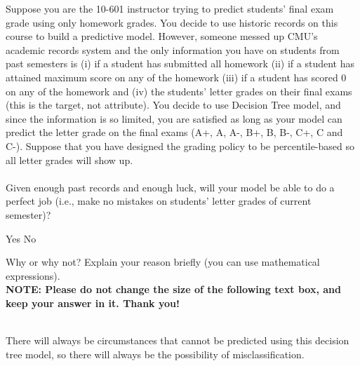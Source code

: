\documentclass[11pt,addpoints,answers]{exam}
\numberwithin{equation}{section} %
\numberwithin{figure}{section} %
\numberwithin{table}{section} %
\begin{document}
\begin{questions}

    \question[3] Suppose you are the 10-601 instructor trying to predict students' final exam grade using only homework grades. You decide to use historic records on this course to build a predictive model. However, someone messed up CMU's academic records system and the only information you have on students from past semesters is (i) if a student has submitted all homework (ii) if a student has attained maximum score on any of the homework (iii) if a student has scored 0 on any of the homework and  (iv) the students' letter grades on their final exams (this is the target, not attribute). You decide to use Decision Tree model, and since the information is so limited, you are satisfied as long as your model can predict the letter grade on the final exams  (A+, A, A-, B+, B, B-, C+, C and C-). Suppose that you have designed the grading policy to be percentile-based so all letter grades will show up. \\ \\
    Given enough past records and enough luck, will your model be able to do a perfect job (i.e., make no mistakes on students' letter grades of current semester)?
    
    \begin{checkboxes}
        \choice Yes
        \CorrectChoice No
    \end{checkboxes}
    Why or why not? Explain your reason briefly (you can use mathematical expressions).\\
    
    \textbf{NOTE: Please do not change the size of the following text box, and keep your answer in it. Thank you!} \\ \\
    \begin{tcolorbox}[fit,height=2cm, width=15cm, blank, borderline={1pt}{-2pt},nobeforeafter,top=2pt, left=2pt, right=2pt, bottom=2pt]
    \large
    There will always be circumstances that cannot be predicted using this decision tree model, so there will always be the possibility of misclassification.

    \end{tcolorbox} \\
    

\end{questions}
\end{document}
